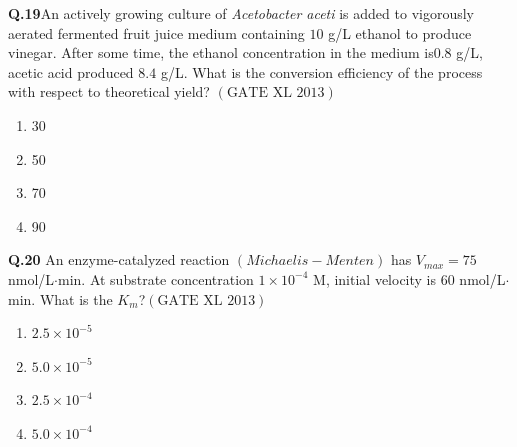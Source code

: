 \documentclass[12pt]{article}
\theoremstyle{remark}
\providecommand{\brak}[1]{\ensuremath{\left(#1\right)}}
\begin{document}
\textbf{Q.19}An actively growing culture of \textit{Acetobacter aceti} is added to vigorously aerated fermented fruit juice medium containing  $10$ g/L ethanol to produce vinegar. After some time, the ethanol concentration in the medium is$0.8$ g/L, acetic acid produced $8.4$ g/L. What is the conversion efficiency of the process with respect to theoretical yield? \hfill $\brak{\text{GATE XL 2013}}$
\begin{enumerate}
    \item 30
    \item 50
    \item 70
    \item 90
\end{enumerate}

\textbf{Q.20} An enzyme-catalyzed reaction \brak{Michaelis-Menten} has $V_{max} = 75$ nmol/L$\cdot$min. At substrate concentration $1 \times 10^{-4}$ M, initial velocity is $60$ nmol/L$\cdot$min. What is the $K_m$?\hfill $\brak{\text{GATE XL 2013}}$
\begin{enumerate}
    \item $2.5 \times 10^{-5}$
    \item $5.0 \times 10^{-5}$
    \item $2.5 \times 10^{-4}$
    \item $5.0 \times 10^{-4}$
\end{enumerate}
\end{document}
